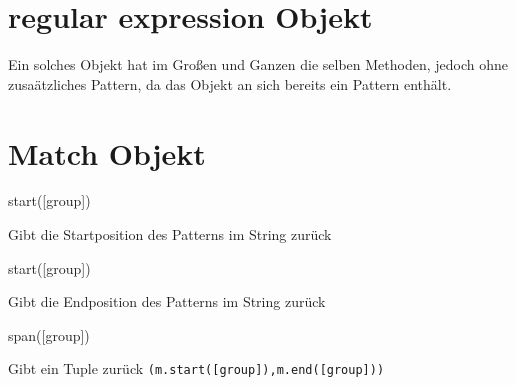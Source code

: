 \documentclass[ignorenonframetext,]{beamer}
\newenvironment{Shaded}{}{}
\newcommand{\NormalTok}[1]{{#1}}
\begin{document}
\section{regular expression Objekt}\label{regular-expression-objekt}

\begin{frame}

Ein solches Objekt hat im Großen und Ganzen die selben Methoden, jedoch
ohne zusaätzliches Pattern, da das Objekt an sich bereits ein Pattern
enthält.

\end{frame}

\section{Match Objekt}\label{match-objekt}

\begin{frame}[fragile]

\begin{Shaded}
\begin{Highlighting}[]
\NormalTok{start([group])}
\end{Highlighting}
\end{Shaded}

Gibt die Startposition des Patterns im String zurück

\begin{Shaded}
\begin{Highlighting}[]
\NormalTok{start([group])}
\end{Highlighting}
\end{Shaded}

Gibt die Endposition des Patterns im String zurück

\begin{Shaded}
\begin{Highlighting}[]
\NormalTok{span([group])}
\end{Highlighting}
\end{Shaded}

Gibt ein Tuple zurück \texttt{(m.start({[}group{]}),m.end({[}group{]}))}

\end{frame}
\end{document}
